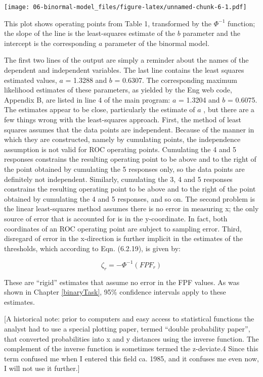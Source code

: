 \documentclass[
]{book}
\begin{document}
\texttt{[image: 06-binormal-model\_files/figure-latex/unnamed-chunk-6-1.pdf]}

This plot shows operating points from Table 1, transformed by the \(\Phi^{-1}\) function; the slope of the line is the least-squares estimate of the \(b\) parameter and the intercept is the corresponding \(a\) parameter of the binormal model.

The first two lines of the output are simply a reminder about the names of the dependent and independent variables. The last line contains the least squares estimated values, \(a\) = 1.3288 and \(b\) = 0.6307. The corresponding maximum likelihood estimates of these parameters, as yielded by the Eng web code, Appendix B, are listed in line 4 of the main program: \(a\) = 1.3204 and \(b\) = 0.6075. The estimates appear to be close, particularly the estimate of \(a\) , but there are a few things wrong with the least-squares approach. First, the method of least squares assumes that the data points are independent. Because of the manner in which they are constructed, namely by cumulating points, the independence assumption is not valid for ROC operating points. Cumulating the 4 and 5 responses constrains the resulting operating point to be above and to the right of the point obtained by cumulating the 5 responses only, so the data points are definitely not independent. Similarly, cumulating the 3, 4 and 5 responses constrains the resulting operating point to be above and to the right of the point obtained by cumulating the 4 and 5 responses, and so on. The second problem is the linear least-squares method assumes there is no error in measuring x; the only source of error that is accounted for is in the y-coordinate. In fact, both coordinates of an ROC operating point are subject to sampling error. Third, disregard of error in the x-direction is further implicit in the estimates of the thresholds, which according to Eqn. (6.2.19), is given by:

\begin{equation*} 
\zeta_r = - \Phi^{-1}\left ( FPF_r \right )
\end{equation*}

These are ``rigid'' estimates that assume no error in the FPF values. As was shown in Chapter \ref{binaryTask}, 95\% confidence intervals apply to these estimates.

{[}A historical note: prior to computers and easy access to statistical functions the analyst had to use a special plotting paper, termed ``double probability paper'', that converted probabilities into x and y distances using the inverse function. The complement of the inverse function is sometimes termed the z-deviate.4 Since this term confused me when I entered this field ca. 1985, and it confuses me even now, I will not use it further.{]}
\end{document}
